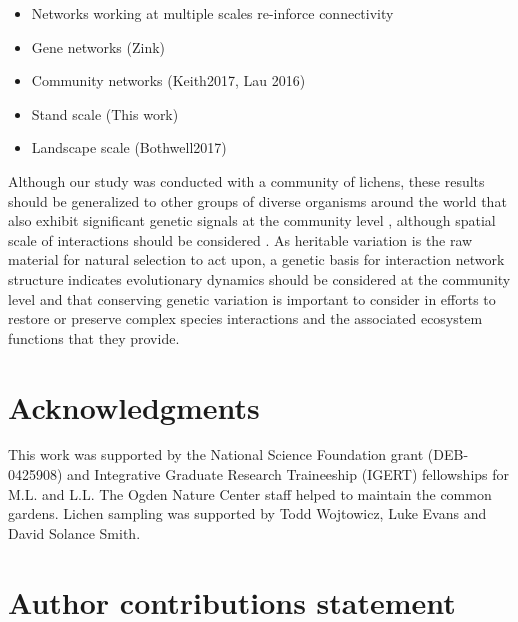 \documentclass[fleqn,10pt]{wlscirep}
\begin{document}
\begin{itemize}
\item Networks working at multiple scales re-inforce connectivity
\item Gene networks (Zink)
\item Community networks (Keith2017, Lau 2016)
\item Stand scale (This work)
\item Landscape scale (Bothwell2017)
\end{itemize}

Although our study was conducted with a community of
lichens, these results should be generalized to other groups of
diverse organisms around the world that also exhibit significant
genetic signals at the community level \cite{Rowntree2011,
  Whitham2012}, although spatial scale of interactions should be
considered \cite{Zook2010}. As heritable variation is the raw material
for natural selection to act upon, a genetic basis for interaction
network structure indicates evolutionary dynamics should be considered
at the community level and that conserving genetic variation is
important to consider in efforts to restore or preserve complex
species interactions and the associated ecosystem functions
\cite{Evans2013} that they provide.








\section*{Acknowledgments} 

This work was supported by the National Science Foundation grant
(DEB-0425908) and Integrative Graduate Research Traineeship (IGERT)
fellowships for M.L. and L.L. The Ogden Nature Center staff helped to
maintain the common gardens. Lichen sampling was supported by Todd
Wojtowicz, Luke Evans and David Solance Smith.


\section*{Author contributions statement}
\end{document}
